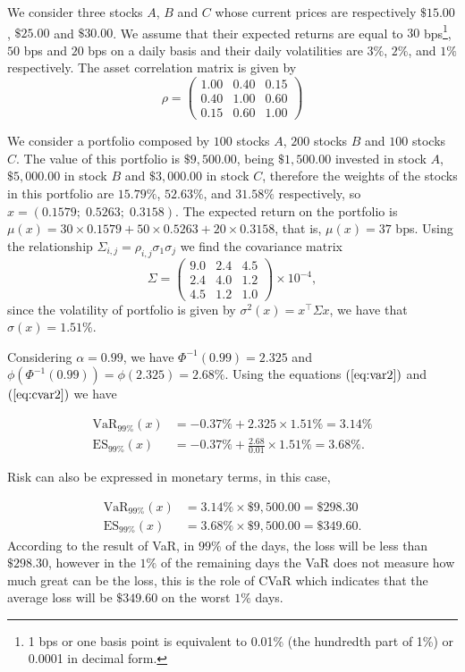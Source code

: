 \begin{example}\normalfont 
We consider three stocks $A$, $B$ and $C$ whose current prices are respectively $\$ 15.00$, $\$ 25.00$ and $\$ 30.00$. We assume that their expected returns are equal to $30$ bps\footnote{1 bps or one basis point is equivalent to
		0.01\% (the hundredth part of 1\%) or 0.0001 in decimal form.}, $50$ bps and $20$ bps on a daily basis and their daily volatilities are $3\%$, $2\%$, and $1\%$ respectively. The asset correlation matrix is given by
	\[
		\rho = \left(
		\begin{array}{rrr}
				1.00 & 0.40 & 0.15 \\
				0.40 & 1.00 & 0.60 \\
				0.15 & 0.60 & 1.00
			\end{array}
		\right)
	\]

	We consider a portfolio composed by $100$ stocks $A$, $200$ stocks $B$ and $100$ stocks $C$. The value of this portfolio is $\$ 9,500.00$, being $\$ 1,500.00$ invested in stock $A$, $\$ 5,000.00$ in stock $B$ and $\$ 3,000.00$ in stock $C$, therefore the weights of the stocks in this portfolio are $15.79\%$, $52.63\%$, and $31.58\%$ respectively, so $x=(0.1579;\;0.5263;\; 0.3158)$. The expected return on the portfolio is $\mu(x) = 30\times0.1579+50\times0.5263+20\times0.3158$, that is, $\mu(x) = 37$ bps. Using the relationship $\Sigma_{i,j}=\rho_{i,j}\sigma_1\sigma_j$ we find the covariance matrix
	\[
		\Sigma = \left(
		\begin{array}{llr}
				9.0 & 2.4 & 4.5 \\
				2.4 & 4.0 & 1.2 \\
				4.5 & 1.2 & 1.0
			\end{array}
		\right)\times10^{-4},
	\] since the volatility of portfolio is given by $\sigma^2(x) = x^\top \Sigma x$, we have that $\sigma(x) = 1.51\%$.

	Considering $\alpha = 0.99$, we have $\Phi^{-1}(0.99) = 2.325$ and
	$\phi(\Phi^{-1}(0.99))=\phi(2.325)=2.68\%$. Using the equations
	$(\ref{eq:var2})$ and $(\ref{eq:cvar2})$ we have

	\[
		\begin{aligned}
			\mathrm{VaR}_{99\%}(x) & = -0.37\% + 2.325 \times 1.51\% = 3.14\%              \\
			\mathrm{ES}_{99\%}(x)  & = -0.37\% + \frac{2.68}{0.01} \times 1.51\% = 3.68\%.
		\end{aligned}
	\]

	Risk can also be expressed in monetary terms, in this case,

	\[
		\begin{aligned}
			\mathrm{VaR}_{99\%}(x) & = 3.14\% \times \$ 9,500.00 = \$ 298.30  \\
			\mathrm{ES}_{99\%}(x)  & = 3.68\% \times \$ 9,500.00 = \$ 349.60.
		\end{aligned}
	\]
	According to the result of {\rm VaR}, in $99\%$ of the days, the loss will be less than $\$ 298.30$, however in the $1\%$ of the remaining days the {\rm VaR} does not measure how much great can be the loss, this is the role of {\rm CVaR} which indicates that the average loss will be $\$ 349.60$ on the worst $1\%$ days.
\end{example}



